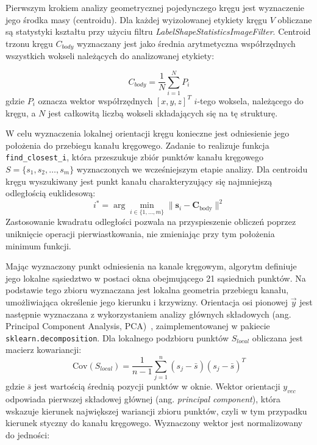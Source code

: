 Pierwszym krokiem analizy geometrycznej pojedynczego kręgu jest wyznaczenie jego środka masy (centroidu).
Dla każdej wyizolowanej etykiety kręgu $V$ obliczane są statystyki kształtu przy użyciu filtru \textit{LabelShapeStatisticsImageFilter}.
Centroid trzonu kręgu $C_{body}$ wyznaczany jest jako średnia arytmetyczna współrzędnych wszystkich wokseli należących do analizowanej etykiety:

\begin{equation}
    \label{eq:centroid}
    C_{body} = \frac{1}{N} \sum_{i=1}^{N} P_i
\end{equation}
gdzie $P_{i}$ oznacza wektor współrzędnych $[x,y,z]^T$ $i$-tego woksela, należącego do kręgu, a $N$ jest całkowitą liczbą wokseli składających się na tę strukturę.

W celu wyznaczenia lokalnej orientacji kręgu konieczne jest odniesienie jego położenia do przebiegu kanału kręgowego.
Zadanie to realizuje funkcja \texttt{find\_closest\_i}, która przeszukuje zbiór punktów kanału kręgowego $S=\{s_1,s_2,\ldots,s_m\}$ wyznaczonych we wcześniejszym etapie analizy. Dla centroidu kręgu wyszukiwany jest punkt kanału charakteryzujący się najmniejszą odległością euklidesową:
\begin{equation}
    \label{eq:closest_point}
    i^* = \arg \min_{i \in \{1, \dots, m\}} \| \mathbf{s}_i - \mathbf{C}_{\text{body}} \|^2
\end{equation}
Zastosowanie kwadratu odległości pozwala na przyspieszenie obliczeń poprzez uniknięcie operacji pierwiastkowania, nie zmieniając przy tym położenia minimum funkcji.

Mając wyznaczony punkt odniesienia na kanale kręgowym, algorytm definiuje jego lokalne sąsiedztwo w postaci okna obejmującego 21 sąsiednich punktów.
Na podstawie tego zbioru wyznaczana jest lokalna geometria przebiegu kanału, umożliwiająca określenie jego kierunku i krzywizny.
Orientacja osi pionowej $\vec{y}$ jest następnie wyznaczana z wykorzystaniem analizy głównych składowych (ang. Principal Component Analysis, PCA)~\cite{pca}, zaimplementowanej w pakiecie \texttt{sklearn.decomposition}.
Dla lokalnego podzbioru punktów $S_{local}$ obliczana jest macierz kowariancji:
\begin{equation}
    \text{Cov}(S_{local}) = \frac{1}{n-1} \sum_{j=1}^{n} (s_j - \bar{s})(s_j - \bar{s})^T
\end{equation}
gdzie $\bar{s}$ jest wartością średnią pozycji punktów w oknie.
Wektor orientacji $y_{vec}$ odpowiada pierwszej składowej głównej (ang. \textit{principal component}), która wskazuje kierunek największej wariancji zbioru punktów, czyli w tym przypadku kierunek styczny do kanału kręgowego.
Wyznaczony wektor jest normalizowany do jedności:

